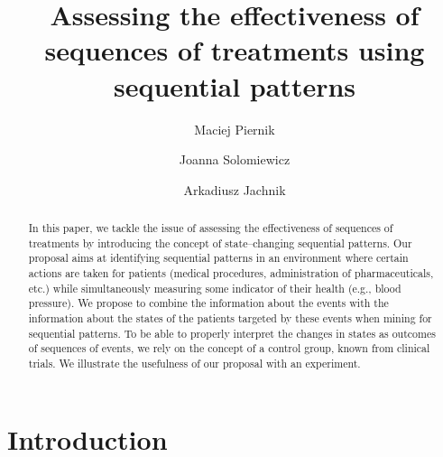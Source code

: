 \documentclass[runningheads,a4paper]{llncs}
\begin{document}
\mainmatter

\title{Assessing the effectiveness of sequences of treatments using sequential patterns}


\author{Maciej Piernik \and Joanna Solomiewicz \and Arkadiusz Jachnik}



\maketitle

\begin{abstract}
In this paper, we tackle the issue of assessing the effectiveness of sequences of treatments by introducing the concept of state--changing sequential patterns.
Our proposal aims at identifying sequential patterns in an environment where certain actions are taken for patients (medical procedures, administration of pharmaceuticals, etc.) while simultaneously measuring some indicator of their health (e.g., blood pressure).
We propose to combine the information about the events with the information about the states of the patients targeted by these events when mining for sequential patterns.
To be able to properly interpret the changes in states as outcomes of sequences of events, we rely on the concept of a control group, known from clinical trials.
We illustrate the usefulness of our proposal with an experiment.
\end{abstract}

\section{Introduction}
\label{sec:introduction}
\end{document}
